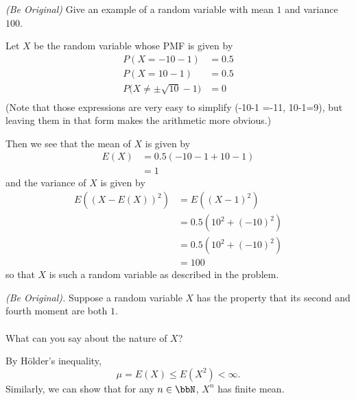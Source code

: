 \begin{problem}[Handout 7, \# 11]
  \emph{(Be Original)} Give an example of a random variable with mean
  \(1\) and variance \(100\).
\end{problem}
\begin{solution}
  Let $X$ be the random variable whose PMF is given by
  \begin{align*}
    P(X = -10-1) &= 0.5\\
    P(X = 10-1) &= 0.5\\
    P\bigl(X \neq \pm \sqrt{10}-1\bigr) &= 0\\
  \end{align*}
  (Note that those expressions are very easy to simplify (-10-1 =-11,
  10-1=9), but leaving them in that form makes the arithmetic more
  obvious.)

  Then we see that the mean of $X$ is given by
  \begin{align*}
    E(X) &= 0.5 (-10-1 +10-1)\\
         &= 1
  \end{align*}
  and the variance of $X$ is given by
  \begin{align*}
    E((X-E(X))^2) &= E((X-1)^2) \\
                  &= 0.5 (10^2 + (-10)^2) \\
                  &= 0.5 (10^2 + (-10)^2) \\
                  &= 100
  \end{align*}
  so that $X$ is such a random variable as described in the problem.
\end{solution}
\newpage

\begin{problem}[Handout 7, \# 13]
  \emph{(Be Original).} Suppose a random variable \(X\) has the property
  that its second and fourth moment are both \(1\).
  \\\\
  What can you say about the nature of \(X\)?
\end{problem}
\begin{solution}
  By Hölder's inequality,
  \[
    \mu=E(X)\leq E(X^2)<\infty.
  \]
  Similarly, we can show that for any \(n\in\bbN\), \(X^n\) has finite
  mean.
\end{solution}
\newpage

